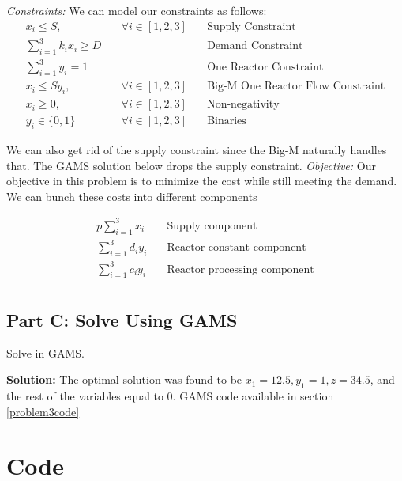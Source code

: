 \documentclass[11pt]{article}
\begin{document}
\textit{Constraints:}
We can model our constraints as follows:
\begin{align*}
  x_i \leq S, & \quad \forall i \in [1,2,3] & \quad \text{Supply Constraint} \\
  \sum_{i=1}^{3} k_i x_i \geq D & \quad & \quad \text{Demand Constraint} \\
  \sum_{i=1}^{3} y_i = 1 & \quad & \quad \text{One Reactor Constraint} \\
  x_i \leq S y_i, & \quad \forall i \in [1,2,3] & \quad \text{Big-M One Reactor Flow Constraint} \\
  x_i \geq 0, & \quad \forall i \in [1,2,3] & \quad \text{Non-negativity} \\
  y_i \in \{ 0,1 \}  & \quad \forall i \in [1,2,3] & \quad \text{Binaries}
\end{align*}

We can also get rid of the supply constraint since the Big-M naturally handles that.
The GAMS solution below drops the supply constraint.
\textit{Objective:}
Our objective in this problem is to minimize the cost while still meeting the demand.
We can bunch these costs into different components

\begin{align*}
  p\sum_{i=1}^{3}x_i  & \quad \text{Supply component} \\
  \sum_{i=1}^{3}d_i y_i & \quad \text{Reactor constant component} \\
  \sum_{i=1}^{3}c_i y_i & \quad \text{Reactor processing component} \\
\end{align*}
\subsection{Part C: Solve Using GAMS}
Solve in GAMS.

\textbf{Solution:}
The optimal solution was found to be $x_1=12.5, y_1=1, z=34.5$, and the rest of the variables equal to 0.
GAMS code available in section \ref{problem3code}


\clearpage
\section{Code}
\end{document}

